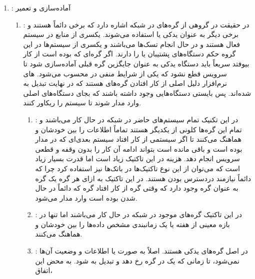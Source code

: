 \begin{enumerate}
    \item {}: آماده‌سازی و تعمیر
    \begin{enumerate}
        \item {}: در حقیقت در گروهی از گره‌های در شبکه اشاره
        دارد که برخی دائماً  هستند و برخی دیگر به عنوان یدکی یا
         استفاده می‌شوند. یکسری از منابع در سیستم فعال هستند و در حال
        انجام تسک‌ها می‌باشند و یکسری از سیستم‌ها در این گروه حکم دستگاه‌های
        پشتیبان یا  را دارند. اگر گره‌ای که  بوده است از
        کار بیوفتد سریعاً باید دستگاه یدکی به عنوان جایگزین گره قبلی آماده‌سازی
        شود تا سرویس قطع نشود که یکی از شرایط منفی در  محسوب
        می‌شود. های نرم‌افزار دلیل اصلی از کار افتادن گره‌های
         هستند که در نهایت تبدیل به  شده‌اند. پس بایستی
        دستگاه‌هایی وجود داشته باشند که بجای دستگاه‌های اصلی وارد مدار شوند تا
        سیستم را ریکاور کنند.
        \begin{enumerate}
            \item {}: در این
            تکنیک تمام سیستم‌های حاضر در شبکه در حال کار می‌باشند و تمام این
            گره‌ها کلونی از یکدیگر هستند تماماً اطلاعات را بین خودشان 
            و هماهنگ می‌کنند تا اگر سیستمی از کار افتاد سیستم بعدی‌ای که در مدار
            بوده است و باقی مانده است بتواند ادامه آن کار را بدون وقفه و قطعی
            سرویس انجام دهد. هزینه در این تاکتیک زیاد است اما قدرت
             بسیار زیاد است که می‌توان از این نوع تاکتیک‌ها در
            باتک‌ها نیز استفاده کرد چرا که دائماً نیازمند دردسترس بودن هستند. در
            این تاکتیک به ازای هر گره یک گره به عنوان گره  وجود
            دارد که وقتی گره  از کار افتاد گره  که دائماً
            در حال  شدن بوده است وارد مدار می‌شود.
            \item {}: در این تاکتیک گره‌های
            موجود در شبکه در حال کار می‌باشند اما تنها در بازه معینی از هفته یا
            یک زمانبندی مشخص داده‌ها را بین خودشان  و هماهنگ می‌کنند.
            \item {}: در اصل گره‌های یدکی  هستند. اصلاً به صورت  یا  اطلاعات و
            وضعیت آن‌ها  نمی‌شود، تا زمانی که یک  در گره
             رخ دهد و تبدیل به  شود. به محض این اتفاق،

\end{enumerate}
\end{enumerate}
\end{enumerate}

